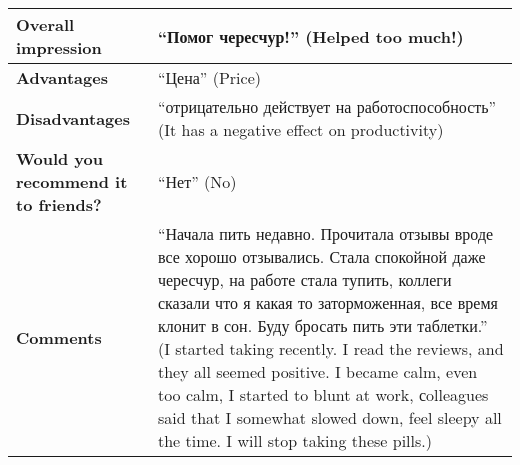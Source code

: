 \begin{tabular}{|p{}|p{}|}
\hline
\textbf{Overall impression}    & ``Помог чересчур!'' (Helped too much!)                                                                                                                                                                                                                                                                                                                                                                                                                                               \\ \hline
\textbf{Advantages}          & ``Цена'' (Price)                                                                                                                                                                                                                                                                                                                                                                                                                                                                   \\ \hline
\textbf{Disadvantages}           & ``отрицательно действует на работоспособность'' (It has a negative effect on productivity)                                                                                                                                                                                                                                                                                                                                                                                         \\ \hline
\textbf{Would you recommend it to friends?} & ``Нет'' (No)                                                                                                                                                                                                                                                                                                                                                                                                                                                                       \\ \hline
\textbf{Comments}             & ``Начала пить недавно. Прочитала отзывы вроде все хорошо отзывались. Стала спокойной даже чересчур, на работе стала тупить, коллеги сказали что я какая то заторможенная, все время клонит в сон. Буду бросать пить эти таблетки.'' (I started taking recently. I read the reviews, and they all seemed positive. I became calm, even too calm, I started to blunt at work, сolleagues said that I somewhat slowed down, feel sleepy all the time. I will stop taking these pills.) \\ \hline
\end{tabular}